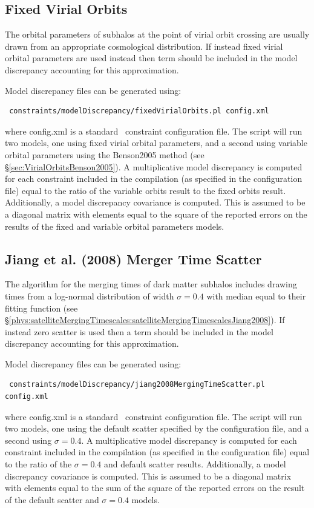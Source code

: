 \subsection{Fixed Virial Orbits}

The orbital parameters of subhalos at the point of virial orbit crossing are usually drawn from an appropriate cosmological distribution. If instead fixed virial orbital parameters are used instead then term should be included in the model discrepancy accounting for this approximation. 

Model discrepancy files can be generated using:
\begin{verbatim}
 constraints/modelDiscrepancy/fixedVirialOrbits.pl config.xml
\end{verbatim}
where {\normalfont \ttfamily config.xml} is a standard \glc\ constraint configuration file. The script will run two models, one using fixed virial orbital parameters, and a second using variable orbital parameters using the {\normalfont \ttfamily Benson2005} method (see \S\ref{sec:VirialOrbitsBenson2005}). A multiplicative model discrepancy is computed for each constraint included in the compilation (as specified in the configuration file) equal to the ratio of the variable orbits result to the fixed orbits result. Additionally, a model discrepancy covariance is computed. This is assumed to be a diagonal matrix with elements equal to the square of the reported errors on the results of the fixed and variable orbital parameters models.

\subsection{Jiang et al. (2008) Merger Time Scatter}

The \cite{jiang_fitting_2008} algorithm for the merging times of dark matter subhalos includes drawing times from a log-normal distribution of width $\sigma=0.4$ with median equal to their fitting function (see \S\ref{phys:satelliteMergingTimescales:satelliteMergingTimescalesJiang2008}). If instead zero scatter is used then a term should be included in the model discrepancy accounting for this approximation. 

Model discrepancy files can be generated using:
\begin{verbatim}
 constraints/modelDiscrepancy/jiang2008MergingTimeScatter.pl config.xml
\end{verbatim}
where {\normalfont \ttfamily config.xml} is a standard \glc\ constraint configuration file. The script will run two models, one using the default scatter specified by the configuration file, and a second using $\sigma=0.4$. A multiplicative model discrepancy is computed for each constraint included in the compilation (as specified in the configuration file) equal to the ratio of the $\sigma=0.4$ and default scatter results. Additionally, a model discrepancy covariance is computed. This is assumed to be a diagonal matrix with elements equal to the sum of the square of the reported errors on the result of the default scatter and $\sigma=0.4$ models.

